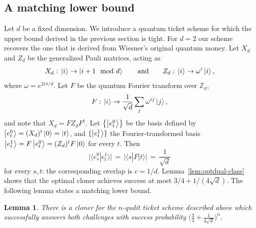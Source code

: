 \documentclass[11pt,letterpaper]{article}
\newtheorem{lemma}[theorem]{Lemma}
\theoremstyle{definition}
\newcommand{\microspace}{\mspace{0.5mu}}
\def\integer{\mathbb{Z}}
\def \lket {\left|}
\def \rket {\right\rangle}
\newcommand{\ket}[1]{\lket\microspace #1 \microspace\rket}
\begin{document}
\subsection{A matching lower bound}

Let $d$ be a fixed dimension. 
We introduce a quantum ticket scheme for which the upper bound derived in the
previous section is tight. 
For $d=2$ our scheme recovers the one that is derived from Wiesner's
original quantum money.
Let $X_d$ and $Z_d$ be the generalized Pauli matrices, acting as 
$$X_d:\,\ket{i}\to\ket{i+1\mod d}\qquad\text{and}\qquad Z_d:\,\ket{i}\to \omega^{i}\ket{i},$$
 where 
$\omega = e^{2i\pi/d}$. 
Let $F$ be the quantum Fourier transform over $\integer_d$, 
$$F:\,\ket{i} \to \frac{1}{\sqrt{d}} \sum_j \omega^{ij} \ket{j},$$
and note that $X_d = FZ_d F^\dagger$. 
Let $\left\{\ket{e_t^0}\right\}$ be the basis defined by 
$\ket{e_t^0} = (X_d)^t\ket{0} = \ket{t}$, and $\{\ket{e_t^1}\}$
the Fourier-transformed basis $\ket{e_t^1} = F\ket{e_t^0} = (Z_d)^t
F\ket{0}$ for every $t$. 
Then 
$$\big|\langle e_s^0 | e_t^1\rangle\big| 
\,=\,\big|\langle s | F | t\rangle \big|\,=\,\frac{1}{\sqrt{d}}$$
 for every $s,t$: 
the corresponding overlap is $c=1/d$. 
Lemma~\ref{lem:optdual-class} shows that the optimal cloner achieves
success at most $3/4+1/(4\sqrt{d})$. The following lemma states a
matching lower bound.

\begin{lemma}\label{lem:class-lb} There is a cloner for the $n$-qudit
  ticket scheme described above which successfully answers both
  challenges with success probability
  $\big(\frac{3}{4}+\frac{1}{4\sqrt{d}}\big)^n$.
\end{lemma}
\end{document}
